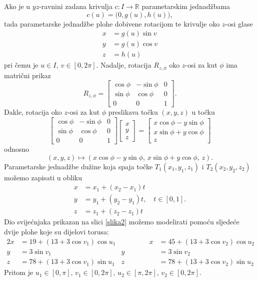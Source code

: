 \documentclass[a4paper,12pt]{article}
\theoremstyle{zad}
\begin{document}
\noindent Ako je u $yz$-ravnini zadana krivulja
$c:I\to\mathbb{R}$ parametarskim jednad\v{z}bama $$c(u)=\big(0,g(u),h(u)\big),$$
tada parametarske jednad\v{z}be plohe dobivene rotacijom te krivulje oko $z$-osi glase
\begin{align*}
x&=g(u)\sin{v}\\
y&=g(u)\cos{v}\\
z&=h(u)
\end{align*}
pri \v{c}emu je $u\in I,\ v\in[0,2\pi]$. Nadalje, rotacija $R_{z,\phi}$ oko $z$-osi za kut $\phi$ ima matri\v{c}ni prikaz
$$R_{z,\phi}=\begin{bmatrix}\cos{\phi}&-\sin{\phi}&0\\ \sin{\phi}&\cos{\phi}&0\\ 0&0&1\end{bmatrix}.$$
Dakle, rotacija oko $z$-osi za kut $\phi$ preslikava to\v{c}ku $(x,y,z)$ u to\v{c}ku
$$\begin{bmatrix}\cos{\phi}&-\sin{\phi}&0\\ \sin{\phi}&\cos{\phi}&0\\ 0&0&1\end{bmatrix}\begin{bmatrix}x\\ y\\ z\end{bmatrix}=
\begin{bmatrix}x\cos{\phi}-y\sin{\phi}\\ x\sin{\phi}+y\cos{\phi}\\ z\end{bmatrix}$$
odnosno
$$(x,y,z)\mapsto (x\cos{\phi}-y\sin{\phi},\,x\sin{\phi}+y\cos{\phi},\,z).$$
Parametarske jednad\v{z}be du\v{z}ine koja spaja to\v{c}ke $T_1(x_1,y_1,z_1)$ i $T_2(x_2,y_2,z_2)$ mo\v{z}emo zapisati u obliku
\begin{align*}
x&=x_1+(x_2-x_1)t\\
y&=y_1+(y_2-y_1)t,\quad t\in[0,1].\\
z&=z_1+(z_2-z_1)t
\end{align*}
Dio svije\'cnjaka prikazan na slici \ref{slika2} možemo modelirati pomo\'cu sljede\'ce dvije plohe koje su dijelovi torusa:
\begin{alignat*}{2}
x&=19+(13+3\cos{v_1})\cos{u_1}&\qquad\qquad x&=45+(13+3\cos{v_2})\cos{u_2}\\[3pt]
y&=3\sin{v_1}& y&=3\sin{v_2}\\[3pt]
z&=78+(13+3\cos{v_1})\sin{u_1}& z&=78+(13+3\cos{v_2})\sin{u_2}
\end{alignat*}
Pritom je $u_1\in[0,\pi],\,v_1\in[0,2\pi],\,u_2\in[\pi,2\pi],\,v_2\in[0,2\pi]$.\vspace*{5pt}
\end{document}
